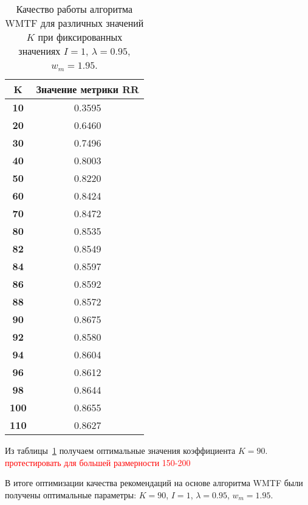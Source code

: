     \begin{table}[ht!]
        \caption{Качество работы алгоритма WMTF для различных значений $K$ при фиксированных значениях $I=1$, $\lambda=0.95$, $w_m=1.95$. \bigskip}
        \centering

        \label{tabular:wtmf_test4}
        \begin{tabular}{|c|c|} \hline
            \bf{K}  & \bf{Значение метрики RR} \\ \hline
            \bf{10} & 0.3595 \\ \hline
            \bf{20} & 0.6460 \\ \hline
            \bf{30} & 0.7496 \\ \hline
            \bf{40} & 0.8003 \\ \hline
            \bf{50} & 0.8220 \\ \hline
            \bf{60} & 0.8424 \\ \hline
            \bf{70} & 0.8472 \\ \hline
            \bf{80} & 0.8535 \\ \hline
            \bf{82} & 0.8549 \\ \hline
            \bf{84} & 0.8597 \\ \hline
            \bf{86} & 0.8592 \\ \hline
            \bf{88} & 0.8572 \\ \hline
            \bf{90} & 0.8675 \\ \hline
            \bf{92} & 0.8580 \\ \hline
            \bf{94} & 0.8604 \\ \hline
            \bf{96} & 0.8612 \\ \hline
            \bf{98} & 0.8644 \\ \hline
            \bf{100} & 0.8655 \\ \hline
            \bf{110} & 0.8627 \\ \hline
        \end{tabular}
    \end{table}
    Из таблицы~\ref{tabular:wtmf_test4} получаем оптимальные значения коэффициента $K=90$. \textcolor{red}{протестировать для большей размерности 150-200}

    В итоге оптимизации качества рекомендаций на основе алгоритма WMTF были получены оптимальные параметры:
    $K=90$, $I=1$, $\lambda=0.95$, $w_m=1.95$.

